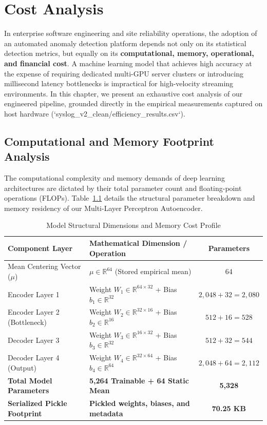 \chapter{Cost Analysis}
\label{ch:cost}

In enterprise software engineering and site reliability operations, the adoption of an automated anomaly detection platform depends not only on its statistical detection metrics, but equally on its \textbf{computational, memory, operational, and financial cost}. A machine learning model that achieves high accuracy at the expense of requiring dedicated multi-GPU server clusters or introducing millisecond latency bottlenecks is impractical for high-velocity streaming environments. In this chapter, we present an exhaustive cost analysis of our engineered pipeline, grounded directly in the empirical measurements captured on host hardware (`syslog_v2_clean/efficiency_results.csv`).

\section{Computational and Memory Footprint Analysis}
\label{sec:cost_compute_memory}
The computational complexity and memory demands of deep learning architectures are dictated by their total parameter count and floating-point operations (FLOPs). Table~\ref{tab:model_footprint_cost} details the structural parameter breakdown and memory residency of our Multi-Layer Perceptron Autoencoder.

\begin{table}[htbp]
\centering
\caption{Model Structural Dimensions and Memory Cost Profile}
\label{tab:model_footprint_cost}
\begin{tabular}{llc}
\toprule
\textbf{Component Layer} & \textbf{Mathematical Dimension / Operation} & \textbf{Parameters} \\
\midrule
Mean Centering Vector ($\mu$) & $\mu \in \mathbb{R}^{64}$ (Stored empirical mean) & 64 \\
Encoder Layer 1 & Weight $W_1 \in \mathbb{R}^{64 \times 32}$ + Bias $b_1 \in \mathbb{R}^{32}$ & $2,048 + 32 = 2,080$ \\
Encoder Layer 2 (Bottleneck) & Weight $W_2 \in \mathbb{R}^{32 \times 16}$ + Bias $b_2 \in \mathbb{R}^{16}$ & $512 + 16 = 528$ \\
Decoder Layer 3 & Weight $W_3 \in \mathbb{R}^{16 \times 32}$ + Bias $b_3 \in \mathbb{R}^{32}$ & $512 + 32 = 544$ \\
Decoder Layer 4 (Output) & Weight $W_4 \in \mathbb{R}^{32 \times 64}$ + Bias $b_4 \in \mathbb{R}^{64}$ & $2,048 + 64 = 2,112$ \\
\midrule
\textbf{Total Model Parameters} & \textbf{5,264 Trainable + 64 Static Mean} & \textbf{5,328} \\
\textbf{Serialized Pickle Footprint} & \textbf{Pickled weights, biases, and metadata} & \textbf{70.25 KB} \\
\bottomrule
\end{tabular}
\end{table}


